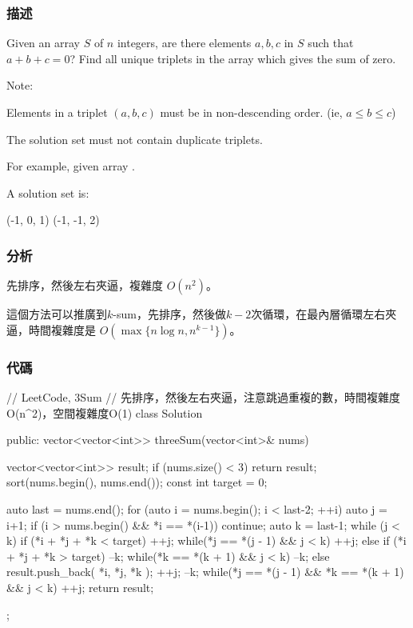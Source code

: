 \subsubsection{描述}
Given an array $S$ of $n$ integers, are there elements $a, b, c$ in $S$ such that $a + b + c = 0$? Find all unique triplets in the array which gives the sum of zero.

Note:
\begindot
\item Elements in a triplet $(a,b,c)$ must be in non-descending order. (ie, $a \leq b \leq c$)
\item The solution set must not contain duplicate triplets.
\myenddot

For example, given array .

A solution set is:
\begin{Code}
(-1, 0, 1)
(-1, -1, 2)
\end{Code}


\subsubsection{分析}
先排序，然後左右夾逼，複雜度 $O(n^2)$。

這個方法可以推廣到$k$-sum，先排序，然後做$k-2$次循環，在最內層循環左右夾逼，時間複雜度是 $O(\max\{n \log n, n^{k-1}\})$。


\subsubsection{代碼}
\begin{Code}
// LeetCode, 3Sum
// 先排序，然後左右夾逼，注意跳過重複的數，時間複雜度O(n^2)，空間複雜度O(1)
class Solution {
    public:
    vector<vector<int>> threeSum(vector<int>& nums) {
        vector<vector<int>> result;
        if (nums.size() < 3) return result;
        sort(nums.begin(), nums.end());
        const int target = 0;

        auto last = nums.end();
        for (auto i = nums.begin(); i < last-2; ++i) {
            auto j = i+1;
            if (i > nums.begin() && *i == *(i-1)) continue;
            auto k = last-1;
            while (j < k) {
                if (*i + *j + *k < target) {
                    ++j;
                    while(*j == *(j - 1) && j < k) ++j;
                } else if (*i + *j + *k > target) {
                    --k;
                    while(*k == *(k + 1) && j < k) --k;
                } else {
                    result.push_back({ *i, *j, *k });
                    ++j;
                    --k;
                    while(*j == *(j - 1) && *k == *(k + 1) && j < k) ++j;
                }
            }
        }
        return result;
    }
};
\end{Code}



